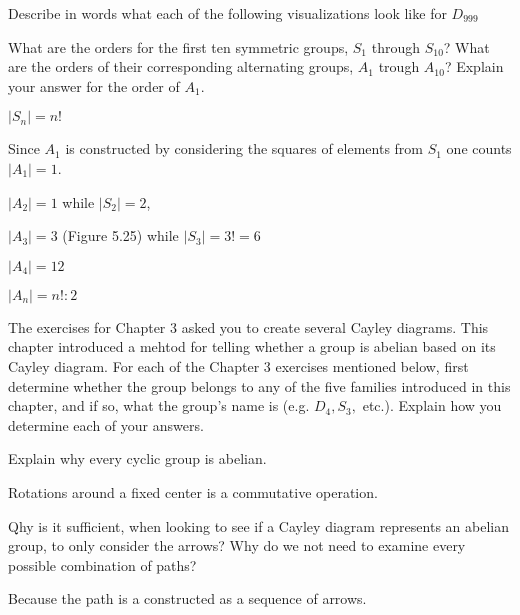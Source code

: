 \documentclass[11pt]{exam}
\begin{document}
\begin{questions}
	\question Describe in words what each of the following visualizations look like for $D_{999}$
	
	\question What are the orders for the first ten symmetric groups, $S_1$ through $S_{10}$? What are the orders of their corresponding alternating groups, $A_1$ trough $A_{10}$? Explain your answer for the order of $A_1$.
	\begin{solution}
		\par $|S_n| = n!$
		
		\par Since $A_1$ is constructed by considering the squares of elements from $S_1$ one counts $|A_1| = 1$.
		
		\par $|A_2| = 1$ while $|S_2| = 2$,
		\par $|A_3| = 3$ (Figure 5.25) while $|S_3| = 3! = 6$
		\par $|A_4| = 12$
		\par $|A_n| = n! : 2$
	\end{solution}

	\question The exercises for Chapter 3 asked you to create several Cayley diagrams. This chapter introduced a mehtod for telling whether a group is abelian based on its Cayley diagram. For each of the Chapter 3 exercises mentioned below, first determine whether the group belongs to any of the five families introduced in this chapter, and if so, what the group's name is (e.g. $D_4, S_3,$ etc.). Explain how you determine each of your answers.


	\question Explain why every cyclic group is abelian.
	\begin{solution}
		\par Rotations around a fixed center is a commutative operation.
	\end{solution}
	
	\question Qhy is it sufficient, when looking to see if a Cayley diagram represents an abelian group, to only consider the arrows? Why do we not need to examine every possible combination of paths?
	\begin{solution}
		\par Because the path is a constructed as a sequence of arrows.
	\end{solution}
	

\end{questions}
\end{document}
